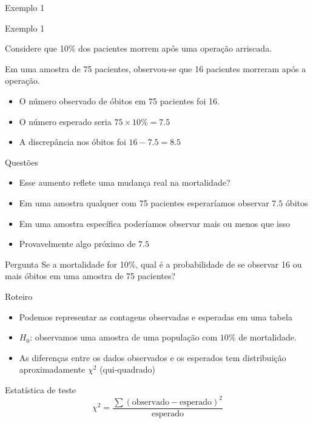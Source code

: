 \documentclass{beamer}
\begin{document}
\begin{frame}{Exemplo 1}
  \begin{exampleblock}{Exemplo 1}
    \footnotesize

    Considere que 10\% dos pacientes morrem após uma operação
    arriscada.

    Em uma amostra de 75 pacientes, observou-se que 16 pacientes
    morreram após a operação.
  \end{exampleblock}
  \begin{itemize}
    \small
  \item O número observado de óbitos em 75 pacientes foi 16.
  \item O número esperado seria $75 \times 10\% = 7.5$
  \item A discrepância nos óbitos foi $16-7.5 = 8.5$
  \end{itemize}
\end{frame}

\begin{frame}{Questões}
  \begin{itemize}
  \item Esse aumento reflete uma mudança real na mortalidade?
  \item Em uma amostra qualquer com 75 pacientes esperaríamos observar $7.5$ óbitos
  \item Em uma amostra específica poderíamos observar mais ou menos
    que isso
  \item Provavelmente algo próximo de $7.5$
  \end{itemize}

  \begin{block}{Pergunta}
    Se a mortalidade for 10\%, qual é a probabilidade de se observar
    16 ou mais óbitos em uma amostra de 75 pacientes?
  \end{block}
\end{frame}

\begin{frame}{Roteiro}
  \begin{itemize}
    \small
  \item Podemos representar as contagens observadas e esperadas em uma tabela
  \item $H_0$: \alert{observamos uma amostra de uma população com
      $10\%$ de mortalidade}.
  \item As diferenças entre os dados observados e os esperados tem
    distribuição aproximadamente $\chi^2$ (qui-quadrado)
  \end{itemize}
  \begin{block}{Estatística de teste}
    $$\chi^2 = \frac{\sum (\text{observado} - \text{esperado})^2 }{\text{esperado}}$$
  \end{block}
\end{frame}
\end{document}

